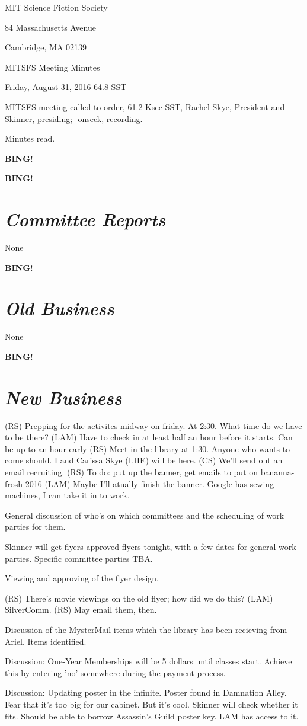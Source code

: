 \documentclass[10pt]{article}
\newcommand{\bing}{{\bf BING!} }
\newcommand{\goto}[1]{\bing \vskip 12pt \section*{{\em{#1}}}}
\newcommand{\skinner}{Rachel Skye, President and Skinner}
\newcommand{\meetingdate}{Friday, August 31, 2016}
\begin{document}
\begin{center}

MIT Science Fiction Society

84 Massachusetts Avenue

Cambridge, MA 02139

\vspace{12pt}

MITSFS Meeting Minutes

\meetingdate
64.8 SST

\end{center}

\vspace{18pt}

\setlength{\parskip}{6pt}

\noindent
MITSFS meeting called to order, 61.2 Ksec SST,
\skinner, presiding; \psuedo-onseck, recording.

Minutes read.

\bing

\goto{Committee Reports}
None

\goto{Old Business}
None

\goto{New Business}
(RS) Prepping for the activites midway on friday. At 2:30. What time do we have to be there?
(LAM) Have to check in at least half an hour before it starts. Can be up to an hour early
(RS) Meet in the library at 1:30. Anyone who wants to come should. I and Carissa Skye (LHE) will be here.
(CS) We'll send out an email recruiting.
(RS) To do: put up the banner, get emails to put on bananna-frosh-2016
(LAM) Maybe I'll atually finish the banner. Google has sewing machines, I can take it in to work.

General discussion of who's on which committees and the scheduling of work parties for them.

Skinner will get flyers approved flyers tonight, with a few dates for general work parties. Specific committee parties TBA.

Viewing and approving of the flyer design. 

(RS) There's movie viewings on the old flyer; how did we do this?
(LAM) SilverComm.
(RS) May email them, then.

Discussion of the MysterMail items which the library has been recieving from Ariel. Items identified. 

Discussion: One-Year Memberships will be 5 dollars until classes start. Achieve this by entering 'no' somewhere during the payment process.

Discussion: Updating poster in the infinite. Poster found in Damnation Alley. Fear that it's too big for our cabinet. But it's cool.
 	    Skinner will check whether it fits. Should be able to borrow Assassin's Guild poster key. LAM has access to it.
\end{document}
